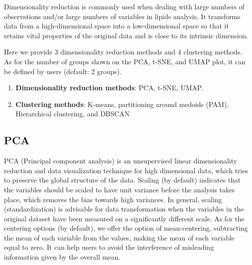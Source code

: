 \documentclass[]{article}
\providecommand{\tightlist}{%
  \setlength{\itemsep}{0pt}\setlength{\parskip}{0pt}}
\begin{document}
Dimensionality reduction is commonly used when dealing with large numbers of observations and/or large numbers of variables in lipids analysis. It transforms data from a high-dimensional space into a low-dimensional space so that it retains vital properties of the original data and is close to its intrinsic dimension.

Here we provide 3 dimensionality reduction methods and 4 clustering methods. As for the number of groups shown on the PCA, t-SNE, and UMAP plot, it can be defined by users (default: 2 groups).

\begin{enumerate}
\def\labelenumi{\arabic{enumi}.}
\tightlist
\item
  \textbf{Dimensionality reduction methods}: PCA, t-SNE, UMAP.
\item
  \textbf{Clustering methods}: K-means, partitioning around medoids (PAM), Hierarchical clustering, and DBSCAN
\end{enumerate}

\hypertarget{PCA}{%
\subsection{PCA}\label{PCA}}

PCA (Principal component analysis) is an unsupervised linear dimensionality reduction and data visualization technique for high dimensional data, which tries to preserve the global structure of the data. Scaling (by default) indicates that the variables should be scaled to have unit variance before the analysis takes place, which removes the bias towards high variances. In general, scaling (standardization) is advisable for data transformation when the variables in the original dataset have been measured on a significantly different scale. As for the centering options (by default), we offer the option of mean-centering, subtracting the mean of each variable from the values, making the mean of each variable equal to zero. It can help users to avoid the interference of misleading information given by the overall mean.
\end{document}
